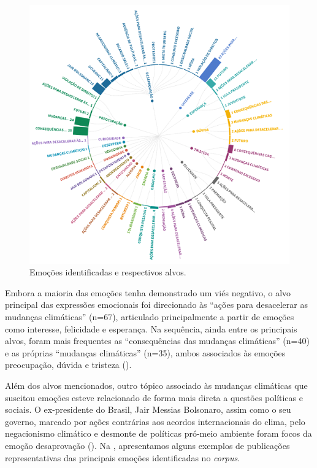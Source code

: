 \documentclass[portuguese]{textolivre}
\begin{document}
\begin{figure}[h!]
    \centering
    \begin{minipage}{0.95\linewidth}
    \includegraphics[width=\linewidth]{Fig3.png}
    \caption{Emoções identificadas e respectivos alvos.}
    \label{fig3}
    \end{minipage}
\end{figure}

Embora a maioria das emoções tenha demonstrado um viés negativo, o alvo principal das expressões emocionais foi direcionado às “ações para desacelerar as mudanças climáticas” (n=67), articulado principalmente a partir de emoções como interesse, felicidade e esperança. Na sequência, ainda entre os principais alvos, foram mais frequentes as “consequências das mudanças climáticas” (n=40) e as próprias “mudanças climáticas” (n=35), ambos associados às emoções preocupação, dúvida e tristeza ().

Além dos alvos mencionados, outro tópico associado às mudanças climáticas que suscitou emoções esteve relacionado de forma mais direta a questões políticas e sociais. O ex-presidente do Brasil, Jair Messias Bolsonaro, assim como o seu governo, marcado por ações contrárias aos acordos internacionais do clima, pelo negacionismo climático e desmonte de políticas pró-meio ambiente \cite{fearnside2019retrocessos,miguel2022negacionismo} foram focos da emoção desaprovação (). Na , apresentamos alguns exemplos de publicações representativas das principais emoções identificadas no \textit{corpus}.
\end{document}
